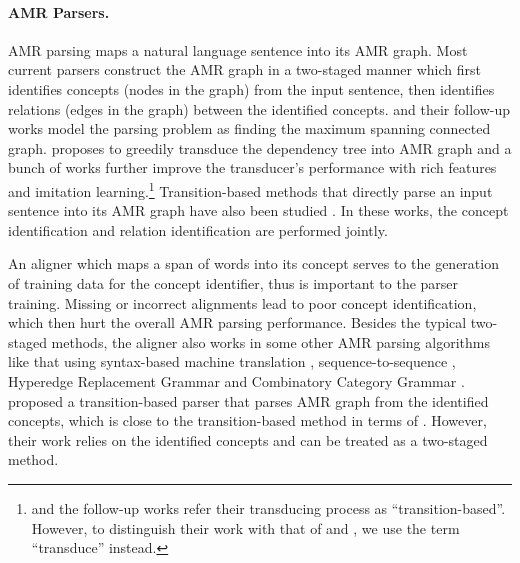 \documentclass[11pt,a4paper]{article}
\begin{document}
\paragraph{AMR Parsers.}
AMR parsing maps a natural language sentence into
its AMR graph.
Most current parsers construct the AMR graph in a two-staged manner
which first identifies concepts (nodes in the graph) from the
input sentence, then identifies relations (edges in the graph)
between the identified concepts.
\citet{flanigan-EtAl:2014:P14-1} and
their follow-up works \cite{flanigan-EtAl:2016:SemEval,zhou-EtAl:2016:EMNLP20163} model
the parsing problem as finding the maximum spanning connected graph.
\citet{wang-xue-pradhan:2015:NAACL-HLT} proposes to greedily transduce
the dependency tree into AMR graph and a bunch of works
\citep{wang-xue-pradhan:2015:ACL-IJCNLP,goodman-vlachos-naradowsky:2016:P16-1,wang-xue:2017:EMNLP2017}
further improve the transducer's performance with rich features and
imitation learning.\footnote{\citet{wang-xue-pradhan:2015:NAACL-HLT} and the follow-up works refer their transducing process
	as ``transition-based''. However, to distinguish their work with that of \citet{damonte-cohen-satta:2017:EACLlong} and \citet{ballesteros-alonaizan:2017:EMNLP2017},
	we use the term ``transduce'' instead.}
Transition-based methods that directly parse an input sentence
into its AMR graph have also been studied
\cite{ballesteros-alonaizan:2017:EMNLP2017,damonte-cohen-satta:2017:EACLlong}.
In these works, the concept identification and relation identification 
are performed jointly. 

An aligner which maps a span of words into its concept 
serves to the generation of training data for the concept identifier,
thus is important to the parser training.
Missing or incorrect alignments lead to poor concept identification,
which then hurt the overall AMR parsing performance.
Besides the typical two-staged methods,
the aligner also works
in some other AMR parsing algorithms like 
that using syntax-based machine translation \cite{pust-EtAl:2015:EMNLP},
sequence-to-sequence \cite{peng-EtAl:2017:EACLlong1,konstas-EtAl:2017:Long},
Hyperedge Replacement Grammar
\cite{peng-song-gildea:2015:CoNLL} and
Combinatory Category Grammar \cite{artzi-lee-zettlemoyer:2015:EMNLP}.
\citet{P18-1171} proposed a transition-based parser
that parses AMR graph from the identified concepts,
which is close to the transition-based method in terms of .
However, their work relies on the identified concepts
and can be treated as a two-staged method.
\end{document}
